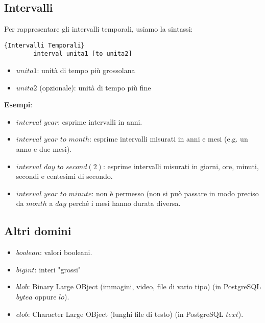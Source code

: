 \subsection{Intervalli}
Per rappresentare gli intervalli temporali, usiamo la sintassi:
    \begin{lstlisting}{Intervalli Temporali}
        interval unita1 [to unita2]
    \end{lstlisting}
    \begin{itemize}
        \item{$unita1$: unità di tempo più grossolana}
        \item{$unita2$ (opzionale): unità di tempo più fine}
    \end{itemize}
\textbf{Esempi}:
    \begin{itemize}
        \item{$interval$ $year$: esprime intervalli in anni.}
        \item{$interval$ $year$ $to$ $month$: esprime intervalli misurati in anni e mesi (e.g. un anno e due mesi).}
        \item{$interval$ $day$ $to$ $second(2)$: esprime intervalli misurati in giorni, ore, minuti, secondi e centesimi di secondo.}
        \item{$interval$ $year$ $to$ $minute$: non è permesso (non si può passare in modo preciso da $month$ a $day$ perché i mesi hanno durata diversa.}
    \end{itemize}

\subsection{Altri domini}
    \begin{itemize}
        \item{$boolean$: valori booleani.}
        \item{$bigint$: interi "grossi"}
        \item{$blob$: Binary Large OBject (immagini, video, file di vario tipo) (in PostgreSQL $bytea$ oppure $lo$).}
        \item{$clob$: Character Large OBject (lunghi file di testo) (in PostgreSQL $text$).}
    \end{itemize}

